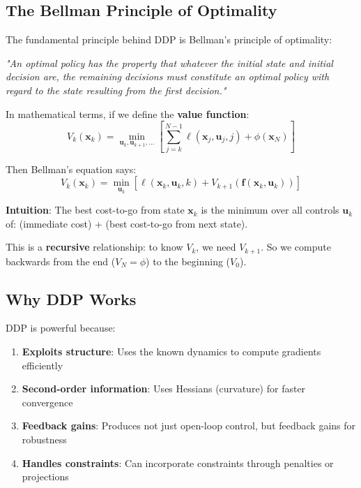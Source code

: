 \documentclass[11pt,a4paper]{article}
\begin{document}
\subsection{The Bellman Principle of Optimality}

The fundamental principle behind DDP is Bellman's principle of optimality:

\textit{"An optimal policy has the property that whatever the initial state and initial decision are, the remaining decisions must constitute an optimal policy with regard to the state resulting from the first decision."}

In mathematical terms, if we define the \textbf{value function}:
\begin{equation}
V_k(\mathbf{x}_k) = \min_{\mathbf{u}_k, \mathbf{u}_{k+1}, \ldots} \left[ \sum_{j=k}^{N-1} \ell(\mathbf{x}_j, \mathbf{u}_j, j) + \phi(\mathbf{x}_N) \right]
\end{equation}

Then Bellman's equation says:
\begin{equation}
V_k(\mathbf{x}_k) = \min_{\mathbf{u}_k} \left[ \ell(\mathbf{x}_k, \mathbf{u}_k, k) + V_{k+1}(\mathbf{f}(\mathbf{x}_k, \mathbf{u}_k)) \right]
\end{equation}

\textbf{Intuition}: The best cost-to-go from state $\mathbf{x}_k$ is the minimum over all controls $\mathbf{u}_k$ of: (immediate cost) + (best cost-to-go from next state).

This is a \textbf{recursive} relationship: to know $V_k$, we need $V_{k+1}$. So we compute backwards from the end ($V_N = \phi$) to the beginning ($V_0$).

\subsection{Why DDP Works}

DDP is powerful because:
\begin{enumerate}
    \item \textbf{Exploits structure}: Uses the known dynamics to compute gradients efficiently
    \item \textbf{Second-order information}: Uses Hessians (curvature) for faster convergence
    \item \textbf{Feedback gains}: Produces not just open-loop control, but feedback gains for robustness
    \item \textbf{Handles constraints}: Can incorporate constraints through penalties or projections
\end{enumerate}
\end{document}
